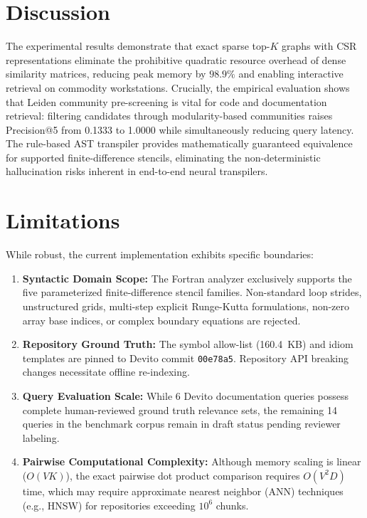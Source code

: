 \documentclass[conference]{IEEEtran}
\begin{document}
\section{Discussion}
The experimental results demonstrate that exact sparse top-$K$ graphs with CSR representations eliminate the prohibitive quadratic resource overhead of dense similarity matrices, reducing peak memory by $98.9\%$ and enabling interactive retrieval on commodity workstations. Crucially, the empirical evaluation shows that Leiden community pre-screening is vital for code and documentation retrieval: filtering candidates through modularity-based communities raises Precision@5 from 0.1333 to 1.0000 while simultaneously reducing query latency. The rule-based AST transpiler provides mathematically guaranteed equivalence for supported finite-difference stencils, eliminating the non-deterministic hallucination risks inherent in end-to-end neural transpilers.

\section{Limitations}
While robust, the current implementation exhibits specific boundaries:
\begin{enumerate}
    \item \textbf{Syntactic Domain Scope:} The Fortran analyzer exclusively supports the five parameterized finite-difference stencil families. Non-standard loop strides, unstructured grids, multi-step explicit Runge-Kutta formulations, non-zero array base indices, or complex boundary equations are rejected.
    \item \textbf{Repository Ground Truth:} The symbol allow-list (160.4~KB) and idiom templates are pinned to Devito commit \texttt{00e78a5}. Repository API breaking changes necessitate offline re-indexing.
    \item \textbf{Query Evaluation Scale:} While 6 Devito documentation queries possess complete human-reviewed ground truth relevance sets, the remaining 14 queries in the benchmark corpus remain in draft status pending reviewer labeling.
    \item \textbf{Pairwise Computational Complexity:} Although memory scaling is linear ($O(VK)$), the exact pairwise dot product comparison requires $O(V^2 D)$ time, which may require approximate nearest neighbor (ANN) techniques (e.g., HNSW) for repositories exceeding $10^6$ chunks.
\end{enumerate}
\end{document}
